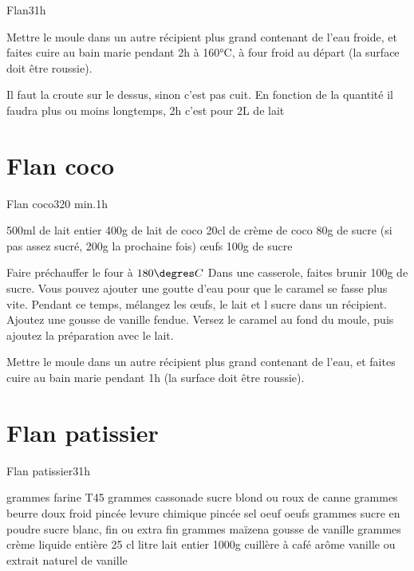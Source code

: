 {\begin{recette}{Flan}{3}{}{1h}
\begin{cuisson}
Mettre le moule dans un autre récipient plus grand contenant de l'eau froide, et faites cuire au bain marie pendant 2h à 160°C, à four froid au départ (la surface doit 
être roussie).

\begin{remarque}
Il faut la croute sur le dessus, sinon c'est pas cuit. En fonction de la quantité il faudra plus ou moins longtemps, 2h c'est pour 2L de lait
\end{remarque}
\end{cuisson}
\end{recette}

\section{Flan coco}
\begin{recette}{Flan coco}{3}{20 min.}{1h}
\begin{ingredients}
\ingredient[Flan]
\ingredient 500ml de lait entier
\ingredient 400g de lait de coco
\ingredient 20cl de crème de coco
\ingredient 80g de sucre (si pas assez sucré, 200g la prochaine fois)
 œufs
\ingredient[Caramel]
\ingredient 100g de sucre
\end{ingredients}

\begin{preparation}
\etape Faire préchauffer le four à $180\degres C$
\etape Dans une casserole, faites brunir 100g de sucre. Vous pouvez ajouter une goutte d'eau pour que le caramel se fasse plus 
vite.
\etape Pendant ce temps, mélangez les œufs, le lait et l sucre dans un récipient. Ajoutez une gousse de vanille fendue.
\etape Versez le caramel au fond du moule, puis ajoutez la préparation avec le lait.
\end{preparation}

\begin{cuisson}
Mettre le moule dans un autre récipient plus grand contenant de l'eau, et faites cuire au bain marie pendant 1h (la surface doit 
être roussie).
\end{cuisson}
\end{recette}

\section{Flan patissier}
\begin{recette}{Flan patissier}{3}{}{1h}
\begin{ingredients}[8 personnes]
\ingredient[Pâte]
 grammes farine T45
 grammes cassonade sucre blond ou roux de canne
 grammes beurre doux froid
 pincée levure chimique
 pincée sel
 oeuf
\ingredient[Flan]
 oeufs
 grammes sucre en poudre sucre blanc, fin ou extra fin
 grammes maïzena
 gousse de vanille
 grammes crème liquide entière 25 cl
 litre lait entier 1000g
 cuillère à café arôme vanille ou extrait naturel de vanille
\end{ingredients}


\end{recette}}
